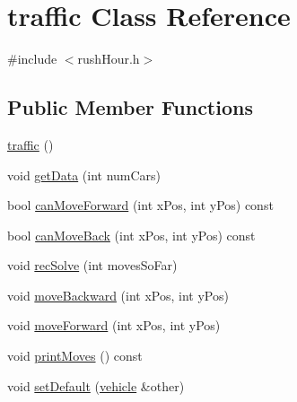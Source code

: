 \hypertarget{classtraffic}{\section{traffic Class Reference}
\label{classtraffic}
}


{\ttfamily \#include $<$rush\-Hour.\-h$>$}

\subsection*{Public Member Functions}
\begin{DoxyCompactItemize}
\item 
\hyperlink{classtraffic_a243bdc0d3985d8637961b00e646b4417}{traffic} ()
\item 
void \hyperlink{classtraffic_a6d877b4ad53af4500b797421c857e9e1}{get\-Data} (int num\-Cars)
\item 
bool \hyperlink{classtraffic_a6e4c103afa210fcb840d472eb69740c7}{can\-Move\-Forward} (int x\-Pos, int y\-Pos) const 
\item 
bool \hyperlink{classtraffic_a1dbfbfe64ea2c90546e8f7630a0c8d31}{can\-Move\-Back} (int x\-Pos, int y\-Pos) const 
\item 
void \hyperlink{classtraffic_a452914d8fc21187707eb3db2592be596}{rec\-Solve} (int moves\-So\-Far)
\item 
void \hyperlink{classtraffic_a8f4bd93b8017c34994793f25fafd97af}{move\-Backward} (int x\-Pos, int y\-Pos)
\item 
void \hyperlink{classtraffic_a3077350949a342adf47a30bd1830a23f}{move\-Forward} (int x\-Pos, int y\-Pos)
\item 
void \hyperlink{classtraffic_a257730086193c01f0930424b8b523ad9}{print\-Moves} () const 
\item 
void \hyperlink{classtraffic_a2e1dd0955f6f51b091f671ea12f575c2}{set\-Default} (\hyperlink{classvehicle}{vehicle} \&other)
\end{DoxyCompactItemize}


